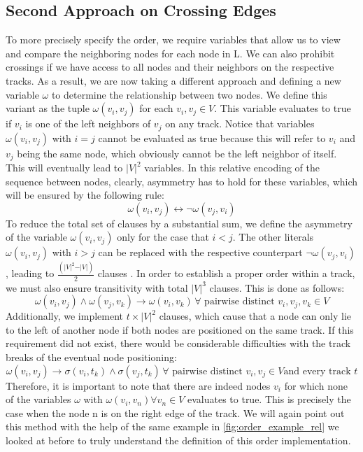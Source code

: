 \documentclass[bachelor, english]{algothesis}
\begin{document}
\subsection{Second Approach on Crossing Edges}
\label{sec:approach2}
To more precisely specify the order, we require variables that allow us to view and compare the neighboring nodes for each node in L. We can also prohibit crossings if we have access to all nodes and their neighbors on the respective tracks. As a result, we are now taking a different approach and defining a new variable $\omega$ to determine the relationship between two nodes. We define this variant as the tuple $\omega(v_i,v_j)$ for each $v_i,v_j \in V$. This variable evaluates to true if $v_i$ is one of the left neighbors of $v_j$ on any track. Notice that variables $\omega(v_i,v_j)$ with $i = j$ cannot be evaluated as true because this will refer to $v_i$ and $v_j$ being the same node, which obviously cannot be the left neighbor of itself. This will eventually lead to ${\vert V \vert}^2$ variables. In this relative encoding of the sequence between nodes, clearly, asymmetry has to hold for these variables, which will be ensured by the following rule: 
    $$ \omega(v_i,v_j) \leftrightarrow \lnot \omega(v_j,v_i) $$ 
To reduce the total set of clauses by a substantial sum, we define the asymmetry of the variable $\omega(v_i,v_j)$ only for the case that $i < j$. The other literals $\omega(v_i,v_j)$ with $i > j$ can be replaced with the respective counterpart $\lnot \omega(v_j,v_i)$, leading to $\frac{(\vert V \vert^2-\vert V \vert)}{2}$ clauses \cite{asymmetric}. In order to establish a proper order within a track, we must also ensure transitivity with total ${\vert V \vert}^3$ clauses. This is done as follows:
    $$ \omega(v_i,v_j) \land \omega(v_j,v_k) \rightarrow \omega(v_i,v_k) \, \forall \text{ pairwise distinct } v_i,v_j,v_k \in V$$ 
Additionally, we implement $t \times {\vert V \vert}^2$ clauses, which cause that a node can only lie to the left of another node if both nodes are positioned on the same track. If this requirement did not exist, there would be considerable difficulties with the track breaks of the eventual node positioning:
    $$ \omega(v_i,v_j) \rightarrow \sigma(v_i,t_k) \land \sigma(v_j,t_k) \, \forall \text{ pairwise distinct } v_i,v_j \in V \text{and every track }t$$ 
Therefore, it is important to note that there are indeed nodes $v_i$ for which none of the variables $\omega$ with $\omega(v_i,v_n) \forall v_n \in V$ evaluates to true. This is precisely the case when the node n is on the right edge of the track. We will again point out this method with the help of the same example in \cref{fig:order_example_rel} we looked at before to truly understand the definition of this order implementation. 
\end{document}
